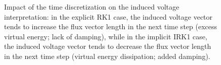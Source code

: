 \begin{frame}
\begin{figure}
        \caption{Impact of the time discretization on the induced voltage interpretation: in the explicit RK1 case, the induced voltage vector tends to increase the flux vector length in the next time step (excess virtual energy; lack of damping), while in the implicit IRK1 case, the induced voltage vector tends to decrease the flux vector length in the next time step (virtual energy dissipation; added damping).}
        \label{fig:rk1_alpha_beta_flux_change_interpretation}
    \end{figure}
\end{frame}

